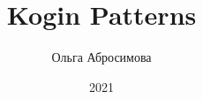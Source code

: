 \documentclass[a4paper ,12pt]{report}
\begin{document}
\title{Kogin Patterns}
\author{Ольга Абросимова}
\date{2021}
\maketitle
\end{document}

